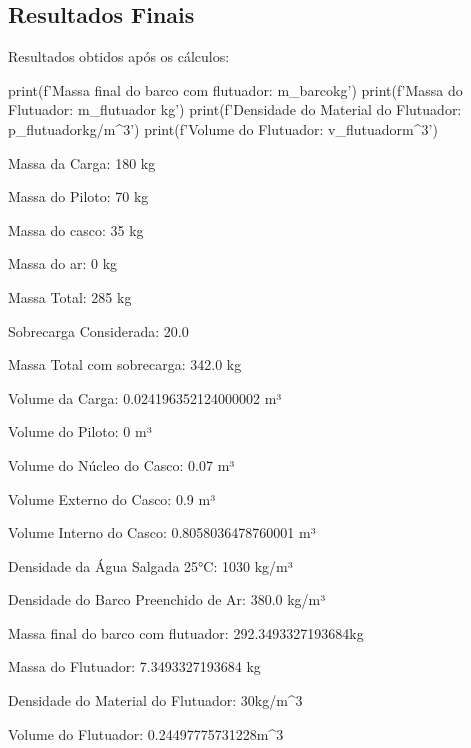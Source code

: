 \documentclass[a4paper]{article}
\begin{document}
\subsection{Resultados Finais}
Resultados obtidos após os cálculos:
\begin{python}
print(f'Massa final do barco com flutuador: {m_barco}kg')
print(f'Massa do Flutuador: {m_flutuador} kg')
print(f'Densidade do Material do Flutuador: {p_flutuador}kg/m^3')
print(f'Volume do Flutuador: {v_flutuador}m^3\n')
\end{python}

Massa da Carga: 180 kg

Massa do Piloto: 70 kg

Massa do casco: 35 kg

Massa do ar: 0 kg

Massa Total: 285 kg

Sobrecarga Considerada: 20.0 %

Massa Total com sobrecarga: 342.0 kg


Volume da Carga: 0.024196352124000002 m³

Volume do Piloto: 0 m³

Volume do Núcleo do Casco: 0.07 m³

Volume Externo do Casco: 0.9 m³

Volume Interno do Casco: 0.8058036478760001 m³


Densidade da Água Salgada 25°C: 1030 kg/m³

Densidade do Barco Preenchido de Ar: 380.0 kg/m³


Massa final do barco com flutuador: 292.3493327193684kg

Massa do Flutuador: 7.3493327193684 kg

Densidade do Material do Flutuador: 30kg/m^3

Volume do Flutuador: 0.24497775731228m^3
\end{document}

